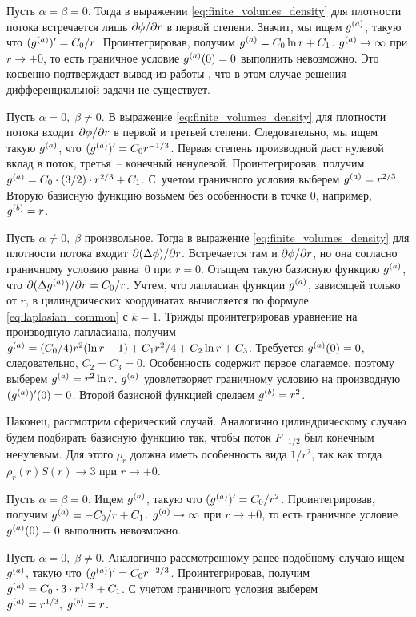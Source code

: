 Пусть $\alpha = \beta = 0$. Тогда в выражении \eqref{eq:finite_volumes_density} для плотности потока встречается лишь $\partial \phi / \partial r$ в первой степени. Значит, мы ищем ${g^{(a)}}$, такую что $(\ga)' \hm = C_0/r$. Проинтегрировав, получим ${g^{(a)}} = C_0 \ln r + C_1$. ${g^{(a)}} \to \infty$ при $r \to +0$, то есть граничное условие ${g^{(a)}}(0) = 0$ выполнить невозможно. Это косвенно подтверждает вывод из работы \cite{zipunova_higher_codimension}, что в этом случае решения дифференциальной задачи не существует.

Пусть $\alpha = 0, \; \beta \neq 0$. В выражение \eqref{eq:finite_volumes_density} для плотности потока входит $\partial \phi / \partial r$ в первой и третьей степени. Следовательно, мы ищем такую ${g^{(a)}}$, что $(\ga)' \hm = C_0 r^{-1/3}$. Первая степень производной даст нулевой вклад в поток, третья~-- конечный ненулевой. Проинтегрировав, получим ${g^{(a)}} = C_0 \cdot (3/2) \cdot r^{2/3} + C_1$. С~учетом граничного условия выберем ${g^{(a)}} = r^{2/3}$. Вторую базисную функцию возьмем без особенности в точке $0$, например, ${g^{(b)}} = r$.

Пусть $\alpha \neq 0, \; \beta$ произвольное. Тогда в выражение \eqref{eq:finite_volumes_density} для плотности потока входит $\partial (\Delta \phi) / \partial r$. Встречается там и $\partial \phi / \partial r$, но она согласно граничному условию равна~$0$ при $r = 0$. Отыщем такую базисную функцию ${g^{(a)}}$, что $\partial (\Delta {g^{(a)}}) / \partial r = C_0 / r$. Учтем, что лапласиан функции ${g^{(a)}}$, зависящей только от $r$, в цилиндрических координатах вычисляется по формуле \eqref{eq:laplasian_common} с $k = 1$. Трижды проинтегрировав уравнение на производную лапласиана, получим ${g^{(a)}} = (C_0/4) r^2 (\ln r - 1) + C_1 r^2 / 4 + C_2 \ln r + C_3$. Требуется ${g^{(a)}}(0) = 0$, следовательно, $C_2 = C_3 = 0$. Особенность содержит первое слагаемое, поэтому выберем ${g^{(a)}} = r^2 \ln r$. ${g^{(a)}}$ удовлетворяет граничному условию на производную $({g^{(a)}})'(0) = 0$. Второй базисной функцией сделаем ${g^{(b)}} = r^2$.

Наконец, рассмотрим сферический случай. Аналогично цилиндрическому случаю будем подбирать базисную функцию так, чтобы поток $F_{-1/2}$ был конечным ненулевым. Для этого $\rho_r$ должна иметь особенность вида $1/r^2$, так как тогда $\rho_r(r) S(r) \to 3$ при $r \to +0$.

Пусть $\alpha = \beta = 0$. Ищем ${g^{(a)}}$, такую что $({g^{(a)}})' = C_0 / r^2$. Проинтегрировав, получим ${g^{(a)}} = -C_0 / r + C_1$. ${g^{(a)}} \to \infty$ при $r \to +0$, то есть граничное условие ${g^{(a)}}(0) = 0$ выполнить невозможно.

Пусть $\alpha = 0, \; \beta \neq 0$. Аналогично рассмотренному ранее подобному случаю ищем ${g^{(a)}}$, такую что $({g^{(a)}})' = C_0 r^{-2/3}$. Проинтегрировав, получим $\ga \hm = C_0 \cdot 3 \cdot r^{1/3} + C_1$. С учетом граничного условия выберем ${g^{(a)}} = r^{1/3}, \; {g^{(b)}} = r$.

